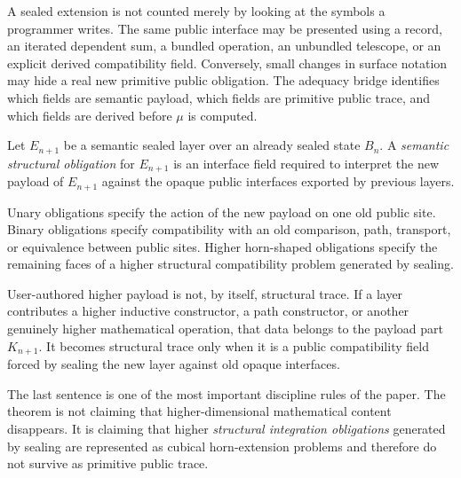 A sealed extension is not counted merely by looking at the symbols a programmer writes.  The
same public interface may be presented using a record, an iterated dependent sum, a bundled
operation, an unbundled telescope, or an explicit derived compatibility field.  Conversely,
small changes in surface notation may hide a real new primitive public obligation.  The
adequacy bridge identifies which fields are semantic payload, which fields are primitive
public trace, and which fields are derived before \(\mu\) is computed.

\begin{definition}
Let \(E_{n+1}\) be a semantic sealed layer over an already sealed state \(B_n\).  A
\emph{semantic structural obligation} for \(E_{n+1}\) is an interface field required to
interpret the new payload of \(E_{n+1}\) against the opaque public interfaces exported by
previous layers.

Unary obligations specify the action of the new payload on one old public site.  Binary
obligations specify compatibility with an old comparison, path, transport, or equivalence
between public sites.  Higher horn-shaped obligations specify the remaining faces of a
higher structural compatibility problem generated by sealing.

User-authored higher payload is not, by itself, structural trace.  If a layer contributes a
higher inductive constructor, a path constructor, or another genuinely higher mathematical
operation, that data belongs to the payload part \(K_{n+1}\).  It becomes structural trace
only when it is a public compatibility field forced by sealing the new layer against old
opaque interfaces.
\end{definition}

The last sentence is one of the most important discipline rules of the paper.  The theorem
is not claiming that higher-dimensional mathematical content disappears.  It is claiming that
higher \emph{structural integration obligations} generated by sealing are represented as
cubical horn-extension problems and therefore do not survive as primitive public trace.


